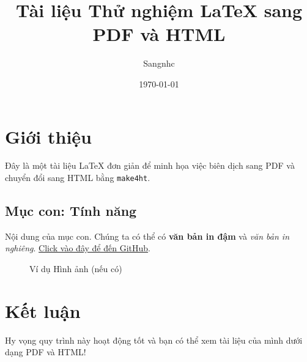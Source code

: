 \documentclass{article}
\title{Tài liệu Thử nghiệm LaTeX sang PDF và HTML}
\author{Sangnhc}
\date{\today}
\begin{document}
\maketitle

\section{Giới thiệu}
Đây là một tài liệu LaTeX đơn giản để minh họa việc biên dịch sang PDF và chuyển đổi sang HTML bằng \texttt{make4ht}.

\subsection{Mục con: Tính năng}
Nội dung của mục con. Chúng ta có thể có \textbf{văn bản in đậm} và \textit{văn bản in nghiêng}.
\href{https://github.com}{Click vào đây để đến GitHub}.

\begin{figure}[H]
    \centering
    \caption{Ví dụ Hình ảnh (nếu có)}
    \label{fig:example}
\end{figure}

\section{Kết luận}
Hy vọng quy trình này hoạt động tốt và bạn có thể xem tài liệu của mình dưới dạng PDF và HTML!
\end{document}
